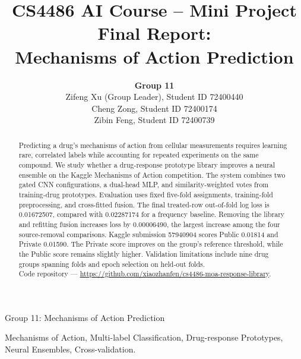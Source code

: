 \documentclass[journal]{IEEEtran}
\begin{document}
\title{CS4486 AI Course -- Mini Project Final Report:\\Mechanisms of Action Prediction}

\author{\textbf{Group 11}\\[0.6em]
    Zifeng Xu (Group Leader), Student ID 72400440 \\[0pt]
    Cheng Zong, Student ID 72400174 \\[0pt]
    Zibin Feng, Student ID 72400739
}
%
{Group 11: Mechanisms of Action Prediction}
\maketitle

\begin{abstract}
Predicting a drug's mechanisms of action from cellular measurements requires learning rare, correlated labels while accounting for repeated experiments on the same compound. We study whether a drug-response prototype library improves a neural ensemble on the Kaggle Mechanisms of Action competition. The system combines two gated CNN configurations, a dual-head MLP, and similarity-weighted votes from training-drug prototypes. Evaluation uses fixed five-fold assignments, training-fold preprocessing, and cross-fitted fusion. The final treated-row out-of-fold log loss is 0.01672507, compared with 0.02287174 for a frequency baseline. Removing the library and refitting fusion increases loss by 0.00006490, the largest increase among the four source-removal comparisons. Kaggle submission 57940904 scores Public 0.01814 and Private 0.01590. The Private score improves on the group's reference threshold, while the Public score remains slightly higher. Validation limitations include nine drug groups spanning folds and epoch selection on held-out folds.\\
Code repository --- \url{https://github.com/xiaozhanfen/cs4486-moa-response-library}.
\end{abstract}

\begin{IEEEkeywords}
Mechanisms of Action, Multi-label Classification, Drug-response Prototypes, Neural Ensembles, Cross-validation.
\end{IEEEkeywords}
\end{document}
